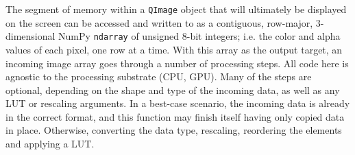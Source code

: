 \documentclass[journal]{vgtc}                %
\begin{document}
The segment of memory within a \texttt{QImage} object that will ultimately be displayed on the screen can be accessed and written to as a contiguous, row-major, 3-dimensional NumPy \texttt{ndarray} of unsigned 8-bit integers; i.e. the color and alpha values of each pixel, one row at a time. With this array as the output target, an incoming image array goes through a number of processing steps. All code here is agnostic to the processing substrate (CPU, GPU). Many of the steps are optional, depending on the shape and type of the incoming data, as well as any LUT or rescaling arguments. In a best-case scenario, the incoming data is already in the correct format, and this function may finish itself having only copied data in place. Otherwise, converting the data type, rescaling, reordering the elements and applying a LUT.


\FloatBarrier

%

%
%
%


\end{document}
